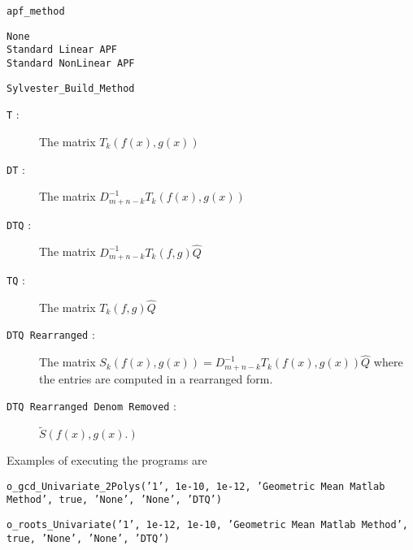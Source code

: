 \documentclass[a4paper,11pt]{article}
\begin{document}
\begin{description}
	
	
	\item 
	\texttt{apf\_method}
		\begin{description}
			\item[\texttt{None}] 
			\item[\texttt{Standard Linear APF}]
			\item[\texttt{Standard NonLinear APF}]
		\end{description}


	\item
	\texttt{Sylvester\_Build\_Method}
		\begin{description}
			
			\item[\texttt{T} : ]
			The matrix 
			$
				T_{k}
				\left(
					f(x)
					,
					g(x)
				\right)
			$
			
			
			\item[\texttt{DT} : ]
			The matrix 
			$
				D^{-1}_{m+n-k}
				T_{k}
				\left(
					f(x)
					,
					g(x)
				\right)
			$
			
			\item[\texttt{DTQ} : ]
			The matrix
			$
				D^{-1}_{m+n-k}
				T_{k}
				\left(
					f
					,
					g
				\right)
				\hat{Q}
			$
			
			
			\item[\texttt{TQ} : ]
			The matrix
			$
				T_{k}
				\left(
					f
					,
					g
				\right)
				\hat{Q}
			$
			
			\item[\texttt{DTQ Rearranged} : ]
			The matrix 
			$
				S_{k}
				\left(
					f(x)
					,
					g(x)
				\right)
				=
				D^{-1}_{m+n-k}
				T_{k}
				\left(
					f(x)
					,
					g(x)
				\right)
				\hat{Q}
			$ where the entries are computed in a rearranged form.
			
			\item[\texttt{DTQ Rearranged Denom Removed} : ]
			$
				\tilde{S}
				\left(
					f(x)
					,
					g(x).
				\right)
			$
			
		\end{description}

%
\end{description}

Examples of executing the programs  are
%

\texttt{o\_gcd\_Univariate\_2Polys('1', 1e-10, 1e-12, 'Geometric Mean Matlab Method', true, 'None', 'None', 'DTQ')}

\texttt{o\_roots\_Univariate('1', 1e-12, 1e-10, 'Geometric Mean Matlab Method', true, 'None', 'None', 'DTQ')}
\end{document}
